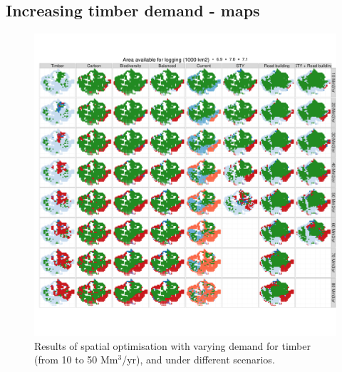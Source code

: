 \documentclass{article}
\begin{document}
\subsection{Increasing timber demand - maps} 

\begin{figure}
    \centering
    \includegraphics[width=\linewidth]{graphs/mapsChangeDemand.pdf}
    \caption{Results of spatial optimisation with varying demand for timber (from 10 to 50 Mm$^3$/yr), and under different scenarios. }
    \label{fig:mapsStrategy}
\end{figure}
\end{document}
